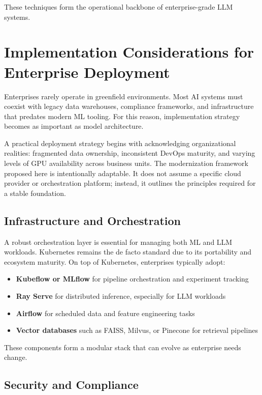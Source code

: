 \documentclass[11pt]{article}
\begin{document}
These techniques form the operational backbone of enterprise-grade LLM systems.
\section{Implementation Considerations for Enterprise Deployment}

Enterprises rarely operate in greenfield environments. Most AI systems must coexist with legacy data warehouses, compliance frameworks, and infrastructure that predates modern ML tooling. For this reason, implementation strategy becomes as important as model architecture.

A practical deployment strategy begins with acknowledging organizational realities: fragmented data ownership, inconsistent DevOps maturity, and varying levels of GPU availability across business units. The modernization framework proposed here is intentionally adaptable. It does not assume a specific cloud provider or orchestration platform; instead, it outlines the principles required for a stable foundation.

\subsection{Infrastructure and Orchestration}

A robust orchestration layer is essential for managing both ML and LLM workloads. Kubernetes remains the de facto standard due to its portability and ecosystem maturity. On top of Kubernetes, enterprises typically adopt:

\begin{itemize}[leftmargin=1.2cm]
    \item \textbf{Kubeflow or MLflow} for pipeline orchestration and experiment tracking
    \item \textbf{Ray Serve} for distributed inference, especially for LLM workloads
    \item \textbf{Airflow} for scheduled data and feature engineering tasks
    \item \textbf{Vector databases} such as FAISS, Milvus, or Pinecone for retrieval pipelines
\end{itemize}

These components form a modular stack that can evolve as enterprise needs change.

\subsection{Security and Compliance}
\end{document}
